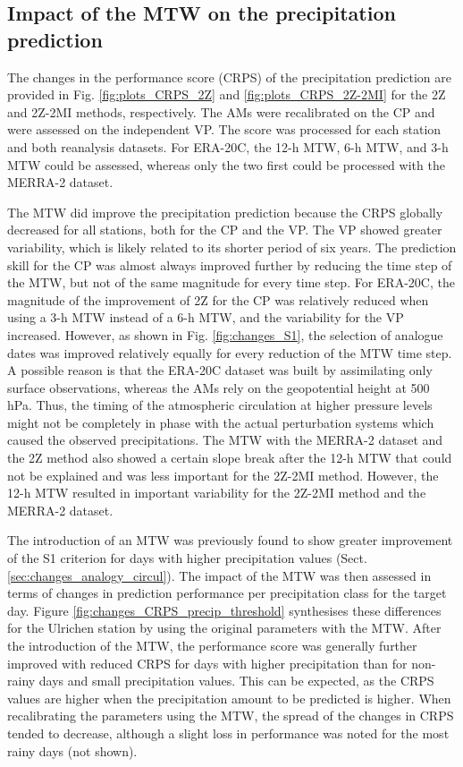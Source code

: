 \documentclass[hess, manuscript]{copernicus}
\begin{document}
	
	\subsection{Impact of the MTW on the precipitation prediction}
	\label{sec:influence_scores}
	
	The changes in the performance score (CRPS) of the precipitation prediction are provided in Fig. \ref{fig:plots_CRPS_2Z} and \ref{fig:plots_CRPS_2Z-2MI} for the 2Z and 2Z-2MI methods, respectively. The AMs were recalibrated on the CP and were assessed on the independent VP. The score was processed for each station and both reanalysis datasets. For ERA-20C, the 12-h MTW, 6-h MTW, and 3-h MTW could be assessed, whereas only the two first could be processed with the MERRA-2 dataset.
	
	The MTW did improve the precipitation prediction because the CRPS globally decreased for all stations, both for the CP and the VP. The VP showed greater variability, which is likely related to its shorter period of six years. The prediction skill for the CP was almost always improved further by reducing the time step of the MTW, but not of the same magnitude for every time step. For ERA-20C, the magnitude of the improvement of 2Z for the CP was relatively reduced when using a 3-h MTW instead of a 6-h MTW, and the variability for the VP increased. However, as shown in Fig. \ref{fig:changes_S1}, the selection of analogue dates was improved relatively equally for every reduction of the MTW time step. A possible reason is that the ERA-20C dataset was built by assimilating only surface observations, whereas the AMs rely on the geopotential height at 500 hPa. Thus, the timing of the atmospheric circulation at higher pressure levels might not be completely in phase with the actual perturbation systems which caused the observed precipitations. The MTW with the MERRA-2 dataset and the 2Z method also showed a certain slope break after the 12-h MTW that could not be explained and was less important for the 2Z-2MI method. However, the 12-h MTW resulted in important variability for the 2Z-2MI method and the MERRA-2 dataset.
	
	The introduction of an MTW was previously found to show greater improvement of the S1 criterion for days with higher precipitation values (Sect. \ref{sec:changes_analogy_circul}). The impact of the MTW was then assessed in terms of changes in prediction performance per precipitation class for the target day. Figure \ref{fig:changes_CRPS_precip_threshold} synthesises these differences for the Ulrichen station by using the original parameters with the MTW. After the introduction of the MTW, the performance score was generally further improved with reduced CRPS for days with higher precipitation than for non-rainy days and small precipitation values. This can be expected, as the CRPS values are higher when the precipitation amount to be predicted is higher. When recalibrating the parameters using the MTW, the spread of the changes in CRPS tended to decrease, although a slight loss in performance was noted for the most rainy days (not shown).
	
\end{document}
